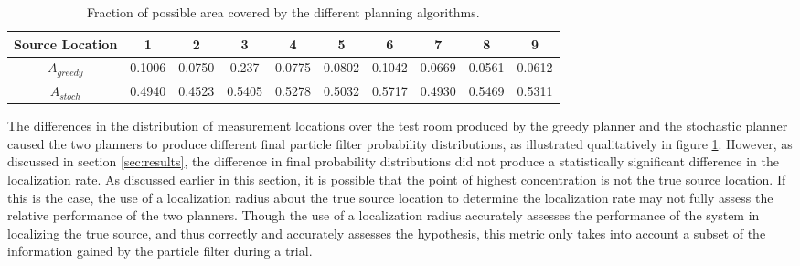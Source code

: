 \documentclass[submit, 12pt]{aiaa-pretty-modified}
\begin{document}
\begin{table}[htb]
\begin{center}
\begin{tabular}{|c||c||c||c||c||c||c||c||c||c|}
\hline
 Source Location & 1 & 2 & 3 & 4 & 5 & 6 & 7 & 8 & 9 \\
\hline \hline
$A_{greedy}$ & 0.1006 & 0.0750 & 0.237 & 0.0775 & 0.0802 & 0.1042 & 0.0669 & 0.0561 & 0.0612 \\
\hline
$A_{stoch}$ & 0.4940 & 0.4523 & 0.5405 & 0.5278 & 0.5032 & 0.5717 & 0.4930 & 0.5469 & 0.5311 \\
\hline
\end{tabular}
\caption{Fraction of possible area covered by the different planning algorithms.}
\label{tab:paths}
\end{center}
\end{table}

The differences in the distribution of measurement locations over the test room
produced by the greedy planner and the stochastic planner caused the
two planners
to produce different final particle filter probability distributions,
as illustrated qualitatively in figure \ref{tab:paths}.  However, as
discussed in section \ref{sec:results}, the difference in final
probability distributions did not produce a statistically significant
difference in the localization rate.  As discussed earlier in this
section, it is possible that the point of highest concentration is
not the true source location.  If this is the case, the use of a localization radius about
the true source location
to determine the localization rate may not fully assess the
relative performance of the two planners.  Though the use of a
localization radius accurately
assesses the performance of the system in localizing the true source,
and thus correctly and accurately assesses the hypothesis, this metric only takes
into account a subset of the information gained by the particle filter
during a trial.
\end{document}
